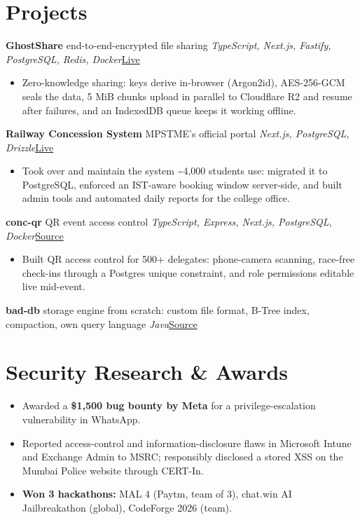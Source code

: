 \documentclass[10pt, a4paper]{article}
\newcommand{\proj}[4]{\par\vspace{2.5pt}\textbf{#1} \textbar{} #2 \textbar{} \textit{\small #3}\hfill{\small #4}\par}
\newcommand{\lnk}[2]{\href{#1}{\color{linkc}#2}}
\begin{document}
\section{Projects}
\proj{GhostShare}{end-to-end-encrypted file sharing}{TypeScript, Next.js, Fastify, PostgreSQL, Redis, Docker}{\lnk{https://share.jkartik.in}{Live}}
\begin{itemize}
  \item Zero-knowledge sharing: keys derive in-browser (Argon2id), AES-256-GCM seals the data, 5 MiB chunks upload in parallel to
  Cloudflare R2 and resume after failures, and an IndexedDB queue keeps it working offline.
\end{itemize}
\proj{Railway Concession System}{MPSTME's official portal}{Next.js, PostgreSQL, Drizzle}{\lnk{https://concession.mpst.me}{Live}}
\begin{itemize}
  \item Took over and maintain the system \textasciitilde{}4,000 students use: migrated it to PostgreSQL, enforced an
  IST-aware booking window server-side, and built admin tools and automated daily reports for the college office.
\end{itemize}
\proj{conc-qr}{QR event access control}{TypeScript, Express, Next.js, PostgreSQL, Docker}{\lnk{https://github.com/Social-Conclave/conc-qr}{Source}}
\begin{itemize}
  \item Built QR access control for 500+ delegates: phone-camera scanning, race-free check-ins through a Postgres unique
  constraint, and role permissions editable live mid-event.
\end{itemize}
\par\vspace{2.5pt}\textbf{bad-db} \textbar{} storage engine from scratch: custom file format, B-Tree index, compaction, own query language \textbar{} \textit{\small Java}\hfill{\small\lnk{https://github.com/KartikJain14/bad-db}{Source}}\par

\section{Security Research \& Awards}
\begin{itemize}
  \item Awarded a \textbf{\$1,500 bug bounty by Meta} for a privilege-escalation vulnerability in WhatsApp.
  \item Reported access-control and information-disclosure flaws in Microsoft Intune and Exchange Admin to MSRC;
  responsibly disclosed a stored XSS on the Mumbai Police website through CERT-In.
  \item \textbf{Won 3 hackathons:} MAL 4 (Paytm, team of 3), chat.win AI Jailbreakathon (global), CodeForge 2026 (team).
\end{itemize}
\end{document}
